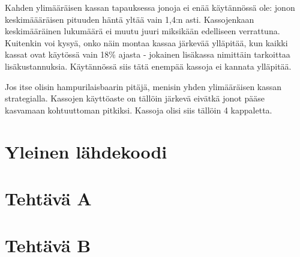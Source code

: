 \documentclass{article}     %
\begin{document}
Kahden ylimääräisen kassan tapauksessa jonoja ei enää käytännössä ole: jonon keskimäääräisen pituuden häntä yltää vain 1,4:n asti. Kassojenkaan keskimääräinen lukumäärä ei muutu juuri miksikään edelliseen verrattuna. Kuitenkin voi kysyä, onko näin montaa kassaa järkevää ylläpitää, kun kaikki kassat ovat käytössä vain 18\% ajasta - jokainen lisäkassa nimittäin tarkoittaa lisäkustannuksia. Käytännössä siis tätä enempää kassoja ei kannata ylläpitää.

Jos itse olisin hampurilaisbaarin pitäjä, menisin yhden ylimääräisen kassan strategialla. Kassojen käyttöaste on tällöin järkevä eivätkä jonot pääse kasvamaan kohtuuttoman pitkiksi. Kassoja olisi siis tällöin 4 kappaletta.

\newpage

\appendix

\section{Yleinen lähdekoodi}





\section{Tehtävä A}



\section{Tehtävä B}
\end{document}
